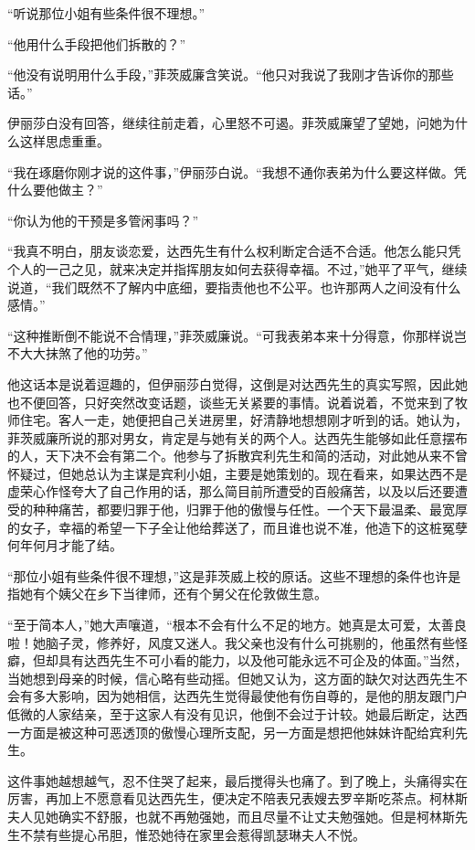 \par “听说那位小姐有些条件很不理想。”
\par “他用什么手段把他们拆散的？”
\par “他没有说明用什么手段，”菲茨威廉含笑说。“他只对我说了我刚才告诉你的那些话。”
\par 伊丽莎白没有回答，继续往前走着，心里怒不可遏。菲茨威廉望了望她，问她为什么这样思虑重重。
\par “我在琢磨你刚才说的这件事，”伊丽莎白说。“我想不通你表弟为什么要这样做。凭什么要他做主？”
\par “你认为他的干预是多管闲事吗？”
\par “我真不明白，朋友谈恋爱，达西先生有什么权利断定合适不合适。他怎么能只凭个人的一己之见，就来决定并指挥朋友如何去获得幸福。不过，”她平了平气，继续说道，“我们既然不了解内中底细，要指责他也不公平。也许那两人之间没有什么感情。”
\par “这种推断倒不能说不合情理，”菲茨威廉说。“可我表弟本来十分得意，你那样说岂不大大抹煞了他的功劳。”
\par 他这话本是说着逗趣的，但伊丽莎白觉得，这倒是对达西先生的真实写照，因此她也不便回答，只好突然改变话题，谈些无关紧要的事情。说着说着，不觉来到了牧师住宅。客人一走，她便把自己关进房里，好清静地想想刚才听到的话。她认为，菲茨威廉所说的那对男女，肯定是与她有关的两个人。达西先生能够如此任意摆布的人，天下决不会有第二个。他参与了拆散宾利先生和简的活动，对此她从来不曾怀疑过，但她总认为主谋是宾利小姐，主要是她策划的。现在看来，如果达西不是虚荣心作怪夸大了自己作用的话，那么简目前所遭受的百般痛苦，以及以后还要遭受的种种痛苦，都要归罪于他，归罪于他的傲慢与任性。一个天下最温柔、最宽厚的女子，幸福的希望一下子全让他给葬送了，而且谁也说不准，他造下的这桩冤孽何年何月才能了结。
\par “那位小姐有些条件很不理想，”这是菲茨威上校的原话。这些不理想的条件也许是指她有个姨父在乡下当律师，还有个舅父在伦敦做生意。
\par “至于简本人，”她大声嚷道，“根本不会有什么不足的地方。她真是太可爱，太善良啦！她脑子灵，修养好，风度又迷人。我父亲也没有什么可挑剔的，他虽然有些怪癖，但却具有达西先生不可小看的能力，以及他可能永远不可企及的体面。”当然，当她想到母亲的时候，信心略有些动摇。但她又认为，这方面的缺欠对达西先生不会有多大影响，因为她相信，达西先生觉得最使他有伤自尊的，是他的朋友跟门户低微的人家结亲，至于这家人有没有见识，他倒不会过于计较。她最后断定，达西一方面是被这种可恶透顶的傲慢心理所支配，另一方面是想把他妹妹许配给宾利先生。
\par 这件事她越想越气，忍不住哭了起来，最后搅得头也痛了。到了晚上，头痛得实在厉害，再加上不愿意看见达西先生，便决定不陪表兄表嫂去罗辛斯吃茶点。柯林斯夫人见她确实不舒服，也就不再勉强她，而且尽量不让丈夫勉强她。但是柯林斯先生不禁有些提心吊胆，惟恐她待在家里会惹得凯瑟琳夫人不悦。



